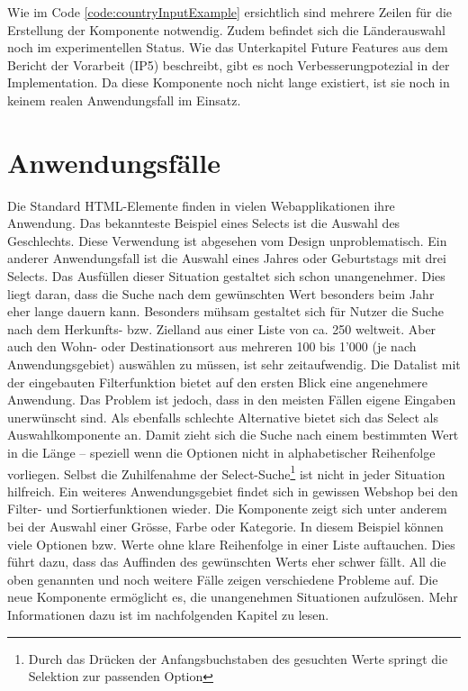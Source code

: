 Wie im Code \ref{code:countryInputExample} ersichtlich sind mehrere Zeilen für die Erstellung der Komponente notwendig. 
Zudem befindet sich die Länderauswahl noch im experimentellen Status. 
Wie das Unterkapitel Future Features aus dem Bericht\citemarktext{
    [\cite{ip5}]
} der Vorarbeit (IP5) beschreibt, gibt es noch Verbesserungpotezial in der Implementation. 
Da diese Komponente noch nicht lange existiert, ist sie noch in keinem realen Anwendungsfall im Einsatz. 


\section{Anwendungsfälle}
\label{sec:useCases}

Die Standard HTML-Elemente finden in vielen Webapplikationen ihre Anwendung. 
Das bekannteste Beispiel eines Selects ist die Auswahl des Geschlechts. 
Diese Verwendung ist abgesehen vom Design unproblematisch. 
Ein anderer Anwendungsfall ist die Auswahl eines Jahres oder Geburtstags mit drei Selects. 
Das Ausfüllen dieser Situation gestaltet sich schon unangenehmer. 
Dies liegt daran, dass die Suche nach dem gewünschten Wert besonders beim Jahr eher lange dauern kann. 
Besonders mühsam gestaltet sich für Nutzer die Suche nach dem Herkunfts- bzw. Zielland aus einer Liste von ca. 250 weltweit. 
Aber auch den Wohn- oder Destinationsort aus mehreren 100 bis 1'000 (je nach Anwendungsgebiet) auswählen zu müssen, ist sehr zeitaufwendig. 
Die Datalist mit der eingebauten Filterfunktion bietet auf den ersten Blick eine angenehmere Anwendung. 
Das Problem ist jedoch, dass in den meisten Fällen eigene Eingaben unerwünscht sind. 
Als ebenfalls schlechte Alternative bietet sich das Select als Auswahlkomponente an. 
Damit zieht sich die Suche nach einem bestimmten Wert in die Länge – speziell wenn die Optionen nicht in alphabetischer Reihenfolge vorliegen. 
Selbst die Zuhilfenahme der Select-Suche\footnote{
    Durch das Drücken der Anfangsbuchstaben des gesuchten Werte springt die Selektion zur passenden Option
} ist nicht in jeder Situation hilfreich. 
Ein weiteres Anwendungsgebiet findet sich in gewissen Webshop bei den Filter- und Sortierfunktionen wieder. 
Die Komponente zeigt sich unter anderem bei der Auswahl einer Grösse, Farbe oder Kategorie. 
In diesem Beispiel können viele Optionen bzw. Werte ohne klare Reihenfolge in einer Liste auftauchen. 
Dies führt dazu, dass das Auffinden des gewünschten Werts eher schwer fällt. 
All die oben genannten und noch weitere Fälle zeigen verschiedene Probleme auf. 
Die neue Komponente ermöglicht es, die unangenehmen Situationen aufzulösen. 
Mehr Informationen dazu ist im nachfolgenden Kapitel zu lesen. 
